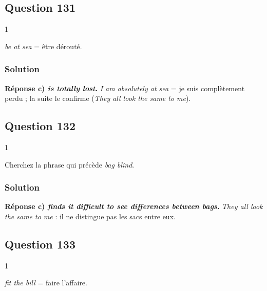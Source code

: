 \documentclass[11pt,a4paper]{article}
\begin{document}
\hypertarget{question-131}{%
\subsection{Question 131}\label{question-131}}

\begin{indication}{1}

\emph{be at sea} = être dérouté.

\end{indication}

\hypertarget{solution-130}{%
\subsubsection{Solution}\label{solution-130}}

\textbf{Réponse c) \emph{is totally lost}.} \emph{I am absolutely at sea} = je suis complètement perdu ; la suite le confirme (\emph{They all look the same to me}).

\hypertarget{question-132}{%
\subsection{Question 132}\label{question-132}}

\begin{indication}{1}

Cherchez la phrase qui précède \emph{bag blind}.

\end{indication}

\hypertarget{solution-131}{%
\subsubsection{Solution}\label{solution-131}}

\textbf{Réponse c) \emph{finds it difficult to see differences between bags}.} \emph{They all look the same to me} : il ne distingue pas les sacs entre eux.

\hypertarget{question-133}{%
\subsection{Question 133}\label{question-133}}

\begin{indication}{1}

\emph{fit the bill} = faire l'affaire.

\end{indication}
\end{document}
